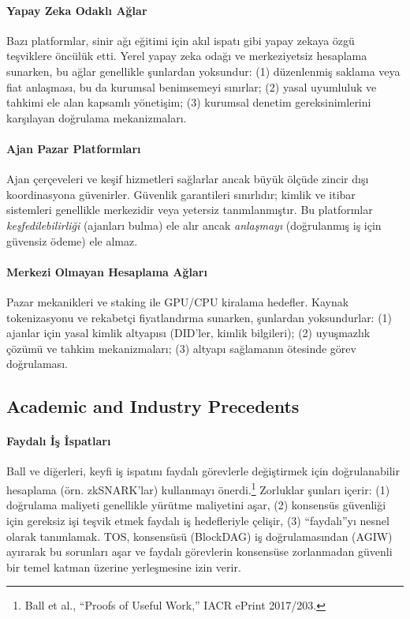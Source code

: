 \documentclass[11pt]{article}
\begin{document}
\paragraph{Yapay Zeka Odaklı Ağlar} Bazı platformlar, sinir ağı eğitimi için akıl ispatı gibi yapay zekaya özgü teşviklere öncülük etti. Yerel yapay zeka odağı ve merkeziyetsiz hesaplama sunarken, bu ağlar genellikle şunlardan yoksundur: (1) düzenlenmiş saklama veya fiat anlaşması, bu da kurumsal benimsemeyi sınırlar; (2) yasal uyumluluk ve tahkimi ele alan kapsamlı yönetişim; (3) kurumsal denetim gereksinimlerini karşılayan doğrulama mekanizmaları.

\paragraph{Ajan Pazar Platformları} Ajan çerçeveleri ve keşif hizmetleri sağlarlar ancak büyük ölçüde zincir dışı koordinasyona güvenirler. Güvenlik garantileri sınırlıdır; kimlik ve itibar sistemleri genellikle merkezidir veya yetersiz tanımlanmıştır. Bu platformlar \emph{keşfedilebilirliği} (ajanları bulma) ele alır ancak \emph{anlaşmayı} (doğrulanmış iş için güvensiz ödeme) ele almaz.

\paragraph{Merkezi Olmayan Hesaplama Ağları} Pazar mekanikleri ve staking ile GPU/CPU kiralama hedefler. Kaynak tokenizasyonu ve rekabetçi fiyatlandırma sunarken, şunlardan yoksundurlar: (1) ajanlar için yasal kimlik altyapısı (DID'ler, kimlik bilgileri); (2) uyuşmazlık çözümü ve tahkim mekanizmaları; (3) altyapı sağlamanın ötesinde görev doğrulaması.

\subsection{Academic and Industry Precedents}
\paragraph{Faydalı İş İspatları} Ball ve diğerleri, keyfi iş ispatını faydalı görevlerle değiştirmek için doğrulanabilir hesaplama (örn. zkSNARK'lar) kullanmayı önerdi.\footnote{Ball et al., ``Proofs of Useful Work,'' IACR ePrint 2017/203.} Zorluklar şunları içerir: (1) doğrulama maliyeti genellikle yürütme maliyetini aşar, (2) konsensüs güvenliği için gereksiz işi teşvik etmek faydalı iş hedefleriyle çelişir, (3) ``faydalı''yı nesnel olarak tanımlamak. TOS, konsensüsü (BlockDAG) iş doğrulamasından (AGIW) ayırarak bu sorunları aşar ve faydalı görevlerin konsensüse zorlanmadan güvenli bir temel katman üzerine yerleşmesine izin verir.
\end{document}
